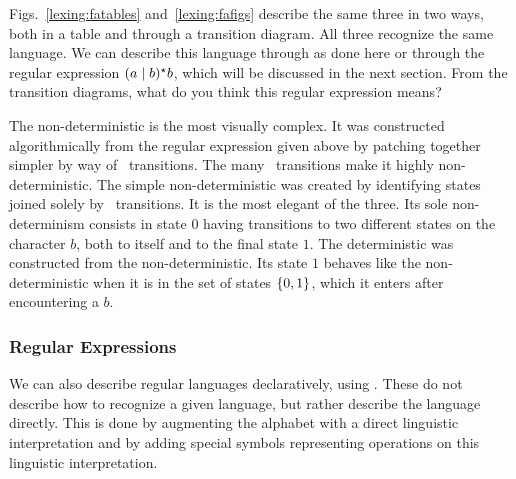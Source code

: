 Figs.~\ref{lexing:fatables} and~\ref{lexing:fafigs} describe the same three \FAs in two ways, both in a table and through a transition diagram. All three \FAs recognize the same language. We can describe this language through \FAs as done here or through the regular expression $(a \mid b)^{\star}{} b$, which will be discussed in the next section. From the transition diagrams, what do you think this regular expression means?

The \emptyword non-deterministic \FA is the most visually complex. It was constructed algorithmically from the regular expression given above by patching together simpler \FAs by way of \emptyword\ transitions. The many \emptyword\ transitions make it highly non-deterministic. The simple non-deterministic \FA was created by identifying states joined solely by \emptyword\ transitions. It is the most elegant of the three. Its sole non-determinism consists in state $0$ having transitions to two different states on the character $b$, both to itself and to the final state $1$. The deterministic \FA was constructed from the non-deterministic. Its state $1$ behaves like the non-deterministic \FA when it is in the set of states $\left\{ 0,1 \right\}$, which it enters after encountering a $b$.

\subsubsection{Regular Expressions}
We can also describe regular languages declaratively, using . These do not describe how to recognize a given language, but rather describe the language directly. This is done by augmenting the alphabet with a direct linguistic interpretation and by adding special symbols representing operations on this linguistic interpretation. 

